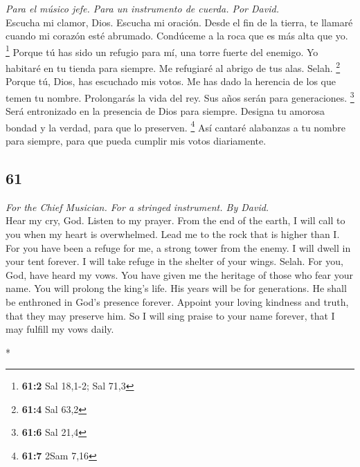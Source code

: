 \begin{paracol}{2}
\emph{Para el músico jefe. Para un instrumento de cuerda. Por David.}\\
 Escucha mi clamor, Dios. Escucha mi oración.
 Desde el fin de la tierra, te llamaré cuando mi corazón
esté abrumado. Condúceme a la roca que es más alta que yo. \footnote{\textbf{61:2}
  Sal 18,1-2; Sal 71,3}  Porque tú has sido un refugio
para mí, una torre fuerte del enemigo.  Yo habitaré en tu
tienda para siempre. Me refugiaré al abrigo de tus alas. Selah.
\footnote{\textbf{61:4} Sal 63,2}  Porque tú, Dios, has
escuchado mis votos. Me has dado la herencia de los que temen tu nombre.
 Prolongarás la vida del rey. Sus años serán para
generaciones. \footnote{\textbf{61:6} Sal 21,4}  Será
entronizado en la presencia de Dios para siempre. Designa tu amorosa
bondad y la verdad, para que lo preserven. \footnote{\textbf{61:7} 2Sam
  7,16}  Así cantaré alabanzas a tu nombre para siempre,
para que pueda cumplir mis votos diariamente.

\switchcolumn
\begin{otherlanguage}{english}

\hypertarget{section-121}{%
\section{61}\label{section-121}}

\emph{For the Chief Musician. For a stringed instrument. By David.}\\
 Hear my cry, God. Listen to my prayer. 
From the end of the earth, I will call to you when my heart is
overwhelmed. Lead me to the rock that is higher than I. 
For you have been a refuge for me, a strong tower from the enemy.
 I will dwell in your tent forever. I will take refuge in
the shelter of your wings. Selah.  For you, God, have
heard my vows. You have given me the heritage of those who fear your
name.  You will prolong the king's life. His years will be
for generations.  He shall be enthroned in God's presence
forever. Appoint your loving kindness and truth, that they may preserve
him.  So I will sing praise to your name forever, that I
may fulfill my vows daily.

\end{otherlanguage}

\switchcolumn[0]*

\hypertarget{silencio-en-dios-la-nada-de-la-gente}{%
}
\end{paracol}
